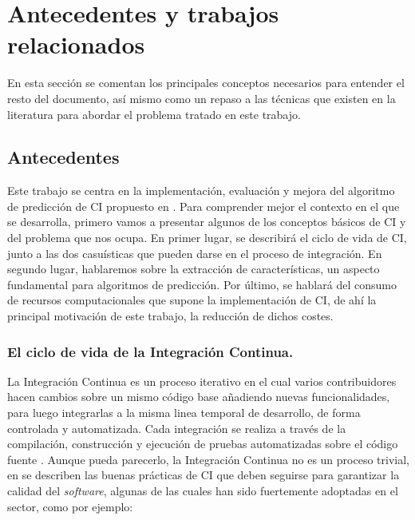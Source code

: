 \section{Antecedentes y trabajos relacionados} \label{sec:background}
En esta sección se comentan los principales conceptos necesarios para entender el resto del
documento, así mismo como un repaso a las técnicas que existen en la literatura para abordar
el problema tratado en este trabajo.\\
\subsection{Antecedentes}
Este trabajo se centra en la implementación, evaluación y mejora del algoritmo de predicción de
CI propuesto en \cite{2}. Para comprender mejor el contexto en el que se desarrolla,
primero vamos a presentar algunos de los conceptos básicos de CI y del problema que
nos ocupa. En primer lugar, se describirá el ciclo de vida de CI, junto a las dos
casuísticas que pueden darse en el proceso de integración. En segundo lugar, hablaremos sobre la
extracción de características, un aspecto fundamental para algoritmos de predicción. Por último,
se hablará del consumo de recursos computacionales que supone la implementación de CI,
de ahí la principal motivación de este trabajo, la reducción de dichos costes.


\subsubsection{El ciclo de vida de la Integración Continua.}
La Integración Continua es un proceso iterativo en el cual varios contribuidores hacen cambios
sobre un mismo código base añadiendo nuevas funcionalidades, para luego integrarlas a la misma
linea temporal de desarrollo, de forma controlada y automatizada. Cada integración se realiza
a través de la compilación, construcción y ejecución de pruebas automatizadas sobre el código
fuente \cite{10}. Aunque pueda parecerlo, la Integración Continua no es un proceso trivial, en
\cite{12} se describen las buenas prácticas de CI que deben seguirse para garantizar
la calidad del \textit{software}, algunas de las cuales han sido fuertemente adoptadas en el
sector, como por ejemplo:

